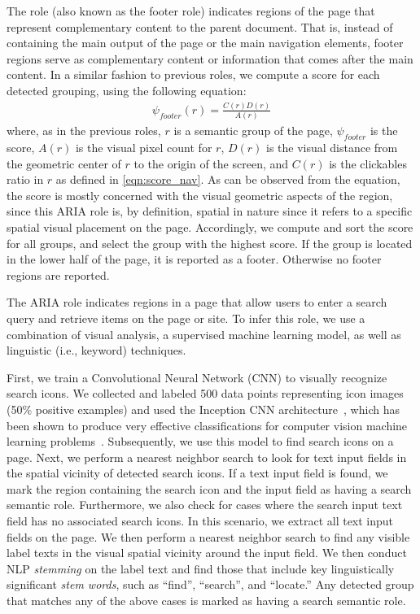 The  role (also known as the footer role) indicates 
regions of the page that represent complementary 
content to the parent document. That is, instead of containing the 
main output of the page or the main navigation elements, footer regions 
serve as complementary content or information that comes after 
the main content. 
In a similar fashion to previous roles, we compute a score for each detected 
grouping, using the following equation:
\begin{align} \label{eqn:score_footer}
    \psi_{footer}(r) = \frac{C(r)D(r)}{A(r)} 
\end{align}
where, as in the previous roles, $r$ is a semantic group of the page, 
$\psi_{footer}$ is the score, 
$A(r)$ is the visual pixel count for $r$, $D(r)$ is the visual 
distance from the geometric center of $r$ to the origin of the screen, 
and $C(r)$ is the clickables ratio in $r$ as defined in \cref{eqn:score_nav}.
As can be observed from the equation, the score is mostly concerned 
with the visual geometric aspects of the region, since this ARIA role
is, by definition, spatial in nature since it refers to a specific 
spatial visual placement on the page. 
Accordingly, we compute and sort the score for all groups, 
and select the group with the highest score. If the group is located 
in the lower half of the page, it is reported as a footer. Otherwise no 
footer regions are reported.

The  ARIA role indicates regions in a page 
that allow users to enter a search query and retrieve items on 
the page or site. To infer this role, we use a combination of 
visual analysis, a supervised machine learning model, as well as 
linguistic (i.e., keyword) techniques.

First, we train a Convolutional Neural Network (CNN) to visually 
recognize search icons. We collected and labeled 
500 data points representing icon images (50\% positive examples) 
and used the Inception CNN architecture~\cite{szegedy2015rethinking}, 
which has been shown to produce very effective classifications for 
computer vision machine learning problems~\cite{szegedy2015rethinking}.
Subsequently, we use this model to find search icons on a page. 
Next, we perform a nearest neighbor search to look for text input 
fields in the spatial vicinity of detected search icons. If a text input field 
is found, we mark the region containing the search icon and the input field 
as having a search semantic role.
Furthermore, we also check for cases where the search input text field 
has no associated search icons. In this scenario, we extract all text 
input fields on the page. We then perform a nearest neighbor search 
to find any visible label texts in the visual spatial vicinity around 
the input field.
We then conduct NLP \emph{stemming} on the label text and find those that 
include key linguistically significant \emph{stem words},
such as ``find'', ``search'', and ``locate.'' 
Any detected group that matches any of the above cases is marked 
as having a search semantic role.

